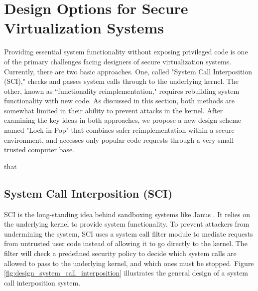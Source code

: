 \section{Design Options for Secure Virtualization Systems}
\label{sec.design}


Providing essential system functionality without exposing privileged code is one of the
primary challenges facing designers of secure virtualization systems.
Currently, there are two basic approaches.
One, called "System Call Interposition (SCI)," checks and passes system calls
through to the underlying kernel. The other, known as ``functionality
reimplementation," requires rebuilding system functionality with new code. As discussed
in this section, both methods are somewhat limited in their ability to
prevent attacks in the kernel. After examining the key ideas in both approaches,
we propose a new design scheme named "Lock-in-Pop" that combines safer reimplementation
within a secure environment, and accesses only popular code requests through a
very small trusted computer base.


that

\subsection{System Call Interposition (SCI)}
SCI is the long-standing idea behind sandboxing systems like Janus
\cite{Janus0:96, Janus:99}. It relies on the underlying kernel
to provide system functionality. To prevent attackers from undermining the system,
SCI uses a system call filter module to mediate requests
from untrusted user code instead of allowing it to go directly to the kernel.
The filter will check a predefined security policy to decide which system calls are
allowed to pass to the underlying kernel, and which ones must be stopped.
%
Figure \ref{fig:design_system_call_interposition} illustrates the general design
of a system call interposition system.

